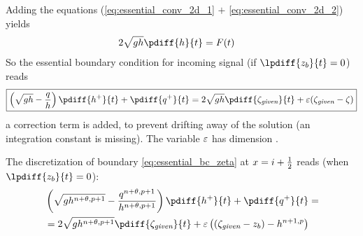 
Adding the equations (\eqref{eq:essential_conv_2d_1} $+$ \eqref{eq:essential_conv_2d_2}) yields
\begin{align}
    2 \sqrt{gh} \pdiff{h}{t} & = F(t)
\end{align}
%
So the essential boundary condition for incoming signal (if $\lpdiff{z_b}{t} = 0$) reads
\begin{align}
    {\boxed{
            \left(\sqrt{gh} - \frac{q}{h}\right) \pdiff{h^{+}}{t} + \pdiff{q^{+}}{t}  = 2 \sqrt{gh} \pdiff{\zeta_{\textit{given}}}{t}  + \eps(\zeta_{\textit{given}} - \zeta)
    }}\label{eq:essential_bc_2d_zeta}
\end{align}
a correction term is added, to prevent drifting away of the solution (an integration constant is missing).
The variable $\varepsilon$ has dimension \bunit{\metre\per\square\second}.

The discretization of  boundary \autoref{eq:essential_bc_zeta} at $x=i+\frac{1}{2}$ reads (when $\lpdiff{z_b}{t}=0$):
\begin{align}
    &\left(\sqrt{gh^{n+\theta,p+1}} - \frac{q^{n+\theta,p+1}}{h^{n+\theta,p+1}}\right) \pdiff{h^{+}}{t} + \pdiff{q^{+}}{t}  =
    \nonumber \\*
    & = 2 \sqrt{gh^{n+\theta,p+1}} \pdiff{\zeta_{\textit{given}}}{t}
    + \eps \left( (\zeta_{\textit{given}} -z_b) - h^{n+1,p}   \right)
\end{align}
